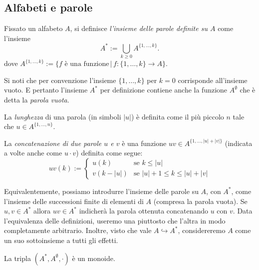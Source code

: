 \subsection{Alfabeti e parole}
\begin{defi}
    Fissato un alfabeto $A$, si definisce \textit{l'insieme delle parole definite su $A$} come l'insieme
\[
A^* := \bigcup_{k \geq 0} A^{\{1,\dots,k\}}.
\]
dove $A^{\{1,\dots,k\}}:=\{ f \text{ è una funzione}\, | \, f: \{ 1, \dots ,k\} \to A\}$.
\end{defi}
Si noti che per convenzione l'insieme $\{1, \dots, k\}$ per $k = 0$ corrisponde all'insieme vuoto. E pertanto l'insieme $A^*$ per definizione contiene anche la funzione $A^{\emptyset}$ che è detta la \textit{parola vuota}.

\begin{defi}
La \textit{lunghezza} di una parola (in simboli $|u|$) è definita come il più piccolo $n$ tale che $u \in A^{\{1,\dots,n\}}$.
\end{defi}

\begin{defi}
La \textit{concatenazione di due parole $u$ e $v$} è una funzione $uv \in A^{\{1,\dots,|u|+|v|\}}$ (indicata a volte anche come $u \cdot v$) definita come segue:
\[
uv(k) := \begin{cases} u(k) & \text{se } k \leq |u| \\ v(k - |u|) & \text{se } |u|+1 \leq k \leq |u|+|v| \end{cases}
\]
\end{defi}
\begin{rema}
Equivalentemente, possiamo introdurre  l'insieme delle parole su $A$, con $A^*$, come l'insieme delle successioni finite di elementi di $A$ (compresa la parola vuota). Se $u, v \in A^*$ allora $uv \in A^*$ indicherà la parola ottenuta concatenando $u$ con $v$.
Data l'equivalenza delle definizioni, 
useremo una piuttosto che l'altra in modo completamente arbitrario.
Inoltre,
visto che vale
$A \hookrightarrow A^*$,
considereremo $A$ come un suo sottoinsieme a tutti gli effetti.
\end{rema}
\begin{rema}
La tripla 
$(A^*,A^\emptyset, \cdot  )$
è un monoide.
\end{rema}
